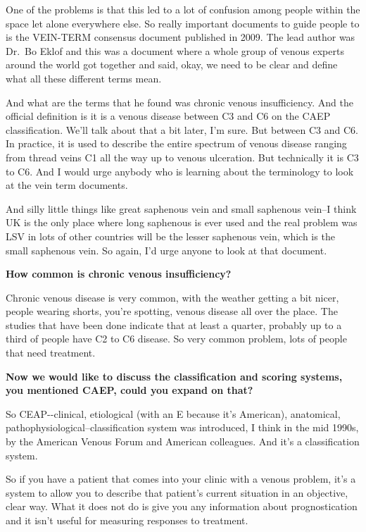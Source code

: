 \documentclass[
]{book}
\begin{document}
One of the problems is that this led to a lot of confusion among people
within the space let alone everywhere else. So really important
documents to guide people to is the VEIN-TERM consensus document
published in 2009.\citep{eklof2009} The lead author was Dr.~Bo Eklof and this
was a document where a whole group of venous experts around the world
got together and said, okay, we need to be clear and define what all
these different terms mean.

And what are the terms that he found was chronic venous insufficiency.
And the official definition is it is a venous disease between C3 and C6
on the CAEP classification. We'll talk about that a bit later, I'm sure.
But between C3 and C6. In practice, it is used to describe the entire
spectrum of venous disease ranging from thread veins C1 all the way up
to venous ulceration. But technically it is C3 to C6. And I would urge
anybody who is learning about the terminology to look at the vein term
documents.

And silly little things like great saphenous vein and small saphenous
vein--I think UK is the only place where long saphenous is ever used and
the real problem was LSV in lots of other countries will be the lesser
saphenous vein, which is the small saphenous vein. So again, I'd urge
anyone to look at that document.

\textbf{How common is chronic venous insufficiency?}

Chronic venous disease is very common, with the weather getting a bit
nicer, people wearing shorts, you're spotting, venous disease all over
the place. The studies that have been done indicate that at least a
quarter, probably up to a third of people have C2 to C6 disease. So very
common problem, lots of people that need treatment.

\textbf{Now we would like to discuss the classification and scoring systems,
you mentioned CAEP, could you expand on that?}

So CEAP-\/-clinical, etiological (with an E because it's American),
anatomical, pathophysiological--classification system was introduced, I
think in the mid 1990s, by the American Venous Forum and American
colleagues. And it's a classification system.

So if you have a patient that comes into your clinic with a venous
problem, it's a system to allow you to describe that patient's current
situation in an objective, clear way. What it does not do is give you
any information about prognostication and it isn't useful for measuring
responses to treatment.
\end{document}
